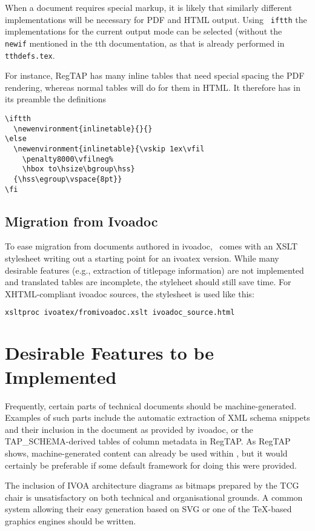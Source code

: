 \documentclass[11pt,a4paper]{ivoa}
\newcommand{\texword}[1]{\texttt{\color{texcolor} #1}}
\begin{document}
When a document requires special markup, it is likely that similarly
different implementations will be necessary for PDF and HTML output.
Using \texword{iftth} the implementations for the current output mode
can be selected (without the \texword{newif} mentioned in the tth
documentation, as that is already performed in \texttt{tthdefs.tex}.

For instance, RegTAP has many inline tables that need special spacing
the PDF rendering, whereas normal tables will do for them
in HTML.  It therefore
has in its preamble the definitions
\begin{lstlisting}
\iftth
  \newenvironment{inlinetable}{}{}
\else
  \newenvironment{inlinetable}{\vskip 1ex\vfil
    \penalty8000\vfilneg%
    \hbox to\hsize\bgroup\hss}
  {\hss\egroup\vspace{8pt}}
\fi
\end{lstlisting}


\subsection{Migration from Ivoadoc}

To ease migration from documents authored in ivoadoc, \ivoatex\ comes
with an XSLT stylesheet writing out a starting point for an ivoatex
version.  While many desirable features (e.g., extraction of titlepage
information) are not implemented and translated tables are incomplete,
the styleheet should still save time.  For XHTML-compliant ivoadoc
sources, the stylesheet is used like this:

\begin{lstlisting}[language=sh]
xsltproc ivoatex/fromivoadoc.xslt ivoadoc_source.html
\end{lstlisting}


\section{Desirable Features to be Implemented}

Frequently, certain parts of technical documents should be
machine-ge\-ne\-ra\-ted.  Examples of such parts include the automatic
extraction of XML schema snippets and their inclusion in the document
as provided by ivoadoc, or the TAP\_SCHEMA-derived tables of column
metadata in RegTAP.  As RegTAP shows, machine-generated content can
already be used within \ivoatex, but it would certainly be preferable if
some default framework for doing this were provided.

The inclusion of IVOA architecture diagrams as bitmaps prepared by the
TCG chair is unsatisfactory on both technical and organisational
grounds.  A common system allowing their easy generation based on SVG or
one of the \TeX-based graphics engines should be written.
\end{document}
